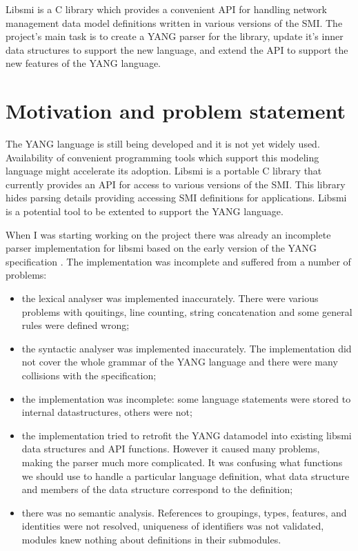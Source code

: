 \documentclass[conference]{IEEEtran}
\begin{document}
Libsmi is a C library which provides a convenient API for handling network management data model definitions written in various versions of the SMI. The project's main task is to create a YANG parser for the library, update it's inner data structures to support the new language, and extend the API to support the new features of the YANG language.

\section{Motivation and problem statement}
The YANG language is still being developed and it is not yet widely used. Availability of convenient programming tools which support this modeling language might accelerate its adoption. Libsmi is  a portable C library that currently provides an API for access to various versions of the SMI. This library hides parsing details providing accessing SMI definitions for applications. Libsmi is a potential tool to be extented to support the YANG language. 

When I was starting working on the project there was already an incomplete parser implementation for libsmi based on the early version of the YANG specification  \cite{bib2}. The implementation was incomplete and suffered from a number of problems: 
\begin{itemize}
	\item the lexical analyser was implemented inaccurately. There were various problems with qouitings, line counting, string concatenation and some general rules were defined wrong;
	\item the syntactic analyser was implemented inaccurately. The implementation did not cover the whole grammar of the YANG language and there were many collisions with the specification;
	\item the implementation was incomplete: some language statements were stored to internal datastructures, others were not;
	\item the implementation tried to retrofit the YANG datamodel into existing libsmi data structures and API functions. However it caused many problems, making the parser much more complicated. It was confusing what functions we should use to handle a particular language definition, what data structure and members of the data structure correspond to the definition;
	\item there was no semantic analysis. References to groupings, types, features, and identities were not resolved, uniqueness of identifiers was not validated, modules knew nothing about definitions in their submodules.
\end{itemize}
\end{document}

